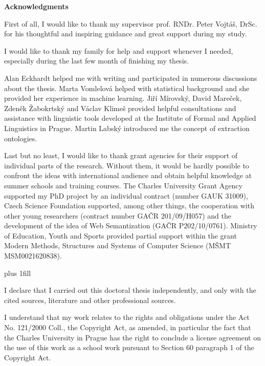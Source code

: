 \documentclass[12pt,a4paper,twoside,openright]{report}
\begin{document}
\openright


{\Huge\bfseries Acknowledgments 
 \par\nobreak \vskip 20pt
}

\noindent First of all, I would like to thank my supervisor prof. RNDr. Peter Vojt\'{a}\v{s}, DrSc. for his thoughtful and inspiring guidance and great support during my study. 

I would like to thank my family for help and support whenever I needed, especially during the last few month of finishing my thesis.

Alan Eckhardt helped me with writing and participated in numerous discussions about the thesis. Marta Vomlelov\'{a} helped with statistical background and she provided her experience in machine learning. Jiří Mírovský, David Mareček, Zdeněk Žabokrtský and Václav Klimeš provided helpful consultations and assistance with linguistic tools developed at the Institute of Formal and Applied Linguistics in Prague. Martin Labský introduced me the concept of extraction ontologies.

Last but no least, I would like to thank grant agencies for their support of individual parts of the research. Without them, it would be hardly possible to confront the ideas with international audience and obtain helpful knowledge at summer schools and training courses. The Charles University Grant Agency supported my PhD project by an individual contract (number GAUK 31009), Czech Science Foundation supported, among other things, the cooperation with other young researchers (contract number GAČR 201/09/H057) and the development of the idea of Web Semantization (GAČR P202/10/0761). Ministry of Education, Youth and Sports provided partial support within the grant Modern Methods, Structures and Systems of Computer Science (MŠMT MSM0021620838).


\openright


\vglue 0pt plus 1fill

\noindent
I declare that I carried out this doctoral thesis independently, and only with the cited
sources, literature and other professional sources.

\medskip\noindent
I understand that my work relates to the rights and obligations under the Act No.
121/2000 Coll., the Copyright Act, as amended, in particular the fact that the Charles
University in Prague has the right to conclude a license agreement on the use of this
work as a school work pursuant to Section 60 paragraph 1 of the Copyright Act.
\end{document}
